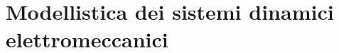\documentclass[../main.tex]{subfiles}
\begin{document}
\clearpage
\thispagestyle{empty}


\section{Modellistica dei sistemi dinamici elettromeccanici}
\end{document}
